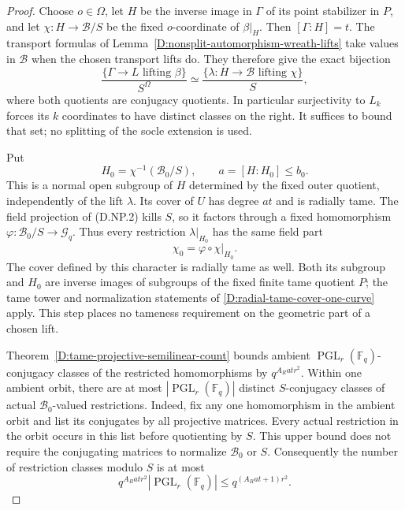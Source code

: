 \begin{proof}
Choose $o\in\Omega$, let $H$ be the inverse image in
$\Gamma$ of its point stabilizer in $P$, and let
$\chi:H\to\mathcal B/S$ be the fixed $o$-coordinate
of $\beta|_H$. Then $[\Gamma:H]=t$.
The transport formulas of
Lemma~\ref{D:nonsplit-automorphism-wreath-lifts} take
values in $\mathcal B$ when the chosen transport lifts
do. They therefore give the exact bijection
\[
 \frac{\{\Gamma\to L\text{ lifting }\beta\}}{S^\Omega}
       \simeq
 \frac{\{\lambda:H\to\mathcal B\text{ lifting }\chi\}}{S},
                                                        \tag{D.NP.5}
\]
where both quotients are conjugacy quotients. In particular
surjectivity to $L_k$ forces its $k$ coordinates to have
distinct classes on the right. It suffices to bound that
set; no splitting of the socle extension is used.

Put
\[
 H_0=\chi^{-1}(\mathcal B_0/S),\qquad
          a=[H:H_0]\leq b_0.
                                                        \tag{D.NP.6}
\]
This is a normal open subgroup of $H$ determined by the
fixed outer quotient, independently of the lift
$\lambda$. Its cover of $U$ has degree $at$ and is
radially tame. The field projection of (D.NP.2) kills
$S$, so it factors through a fixed homomorphism
$\varphi:\mathcal B_0/S\to\mathcal G_q$. Thus every
restriction $\lambda|_{H_0}$ has the same field part
\[
                    \chi_0=\varphi\circ\chi|_{H_0}.
                                                        \tag{D.NP.7}
\]
The cover defined by this character is radially tame
as well. Both its subgroup and $H_0$ are inverse images
of subgroups of the fixed finite tame quotient $P$;
the tame tower and normalization statements of
\ref{D:radial-tame-cover-one-curve} apply. This step
places no tameness requirement on the geometric part
of a chosen lift.

Theorem~\ref{D:tame-projective-semilinear-count} bounds
ambient $\operatorname{PGL}_r(\mathbb F_q)$-conjugacy
classes of the restricted homomorphisms by
$q^{A_Rat r^2}$. Within one ambient orbit, there are
at most $|\operatorname{PGL}_r(\mathbb F_q)|$ distinct
$S$-conjugacy classes of actual $\mathcal B_0$-valued
restrictions. Indeed, fix any one homomorphism in the
ambient orbit and list its conjugates by all projective
matrices. Every actual restriction in the orbit occurs
in this list before quotienting by $S$. This upper
bound does not require the conjugating matrices to
normalize $\mathcal B_0$ or $S$. Consequently the number
of restriction classes modulo $S$ is at most
\[
 q^{A_Rat r^2}|\operatorname{PGL}_r(\mathbb F_q)|
                       \leq q^{(A_Rat+1)r^2}.          \tag{D.NP.8}
\]


\end{proof}
